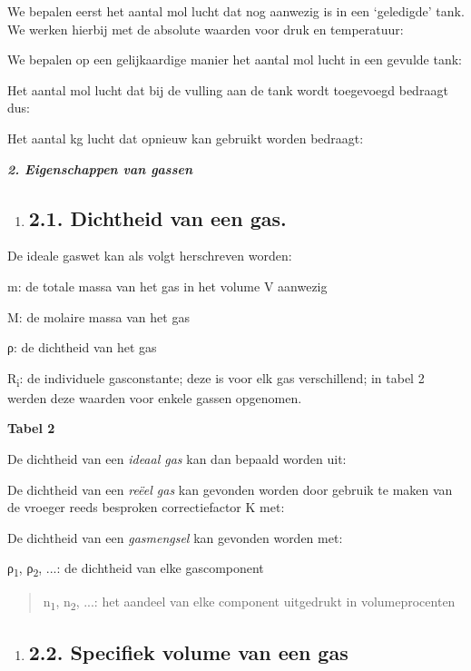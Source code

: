 \documentclass[]{article}
\begin{document}
We bepalen eerst het aantal mol lucht dat nog aanwezig is in een
`geledigde' tank. We werken hierbij met de absolute waarden voor druk en
temperatuur:

We bepalen op een gelijkaardige manier het aantal mol lucht in een
gevulde tank:

Het aantal mol lucht dat bij de vulling aan de tank wordt toegevoegd
bedraagt dus:

Het aantal kg lucht dat opnieuw kan gebruikt worden bedraagt:

\emph{\textbf{2. Eigenschappen van gassen}}

\begin{enumerate}
\item
  \subsection{2.1. Dichtheid van een gas.}\label{dichtheid-van-een-gas.}
\end{enumerate}

De ideale gaswet kan als volgt herschreven worden:

m: de totale massa van het gas in het volume V aanwezig

M: de molaire massa van het gas

ρ: de dichtheid van het gas

R\textsubscript{i}: de individuele gasconstante; deze is voor elk gas
verschillend; in tabel 2 werden deze waarden voor enkele gassen
opgenomen.

\textbf{Tabel 2}

De dichtheid van een \emph{ideaal gas} kan dan bepaald worden uit:

De dichtheid van een \emph{reëel gas} kan gevonden worden door gebruik
te maken van de vroeger reeds besproken correctiefactor K met:

De dichtheid van een \emph{gasmengsel} kan gevonden worden met:

ρ\textsubscript{1}, ρ\textsubscript{2}, ...: de dichtheid van elke
gascomponent

\begin{quote}
n\textsubscript{1}, n\textsubscript{2}, ...: het aandeel van elke
component uitgedrukt in volumeprocenten
\end{quote}

\begin{enumerate}
\item
  \subsection{2.2. Specifiek volume van een
  gas}\label{specifiek-volume-van-een-gas}
\end{enumerate}
\end{document}

